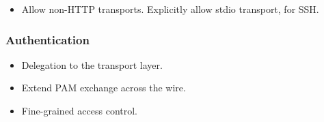 \begin{itemize}

\item Allow non-HTTP transports.  Explicitly allow stdio transport, for SSH.

\end{itemize}

\subsubsection{Authentication}

\begin{itemize}

\item Delegation to the transport layer.

\item Extend PAM exchange across the wire.

\item Fine-grained access control.

\end{itemize}
